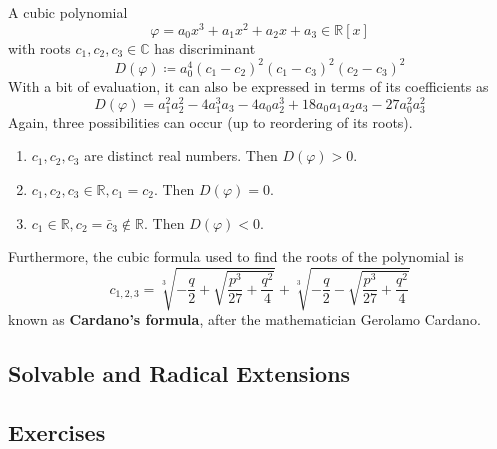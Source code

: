   \begin{lemma}
    \label{thm:cardanos-formula}
    A cubic polynomial 
    \begin{equation}
      \varphi = a_0 x^3 + a_1 x^2 + a_2 x + a_3 \in \mathbb{R}[x]
    \end{equation}
    with roots $c_1, c_2, c_3 \in \mathbb{C}$ has discriminant
    \begin{equation}
      D(\varphi) \coloneqq a_0^4 (c_1 - c_2)^2 (c_1 - c_3)^2 (c_2 - c_3)^2
    \end{equation}
    With a bit of evaluation, it can also be expressed in terms of its coefficients as
    \begin{equation}
      D(\varphi) = a_1^2 a_2^2 - 4a_1^3 a_3 - 4a_0 a_2^3 + 18 a_0 a_1 a_2 a_3 - 27 a_0^2 a_3^2
    \end{equation}
    Again, three possibilities can occur (up to reordering of its roots). 
    \begin{enumerate}
        \item $c_1, c_2, c_3$ are distinct real numbers. Then $D(\varphi) > 0$. 
        \item $c_1, c_2, c_3 \in \mathbb{R}, c_1 = c_2$. Then $D(\varphi) = 0$. 
        \item $c_1 \in \mathbb{R}, c_2 = \bar{c}_3 \not\in \mathbb{R}$. Then $D(\varphi) < 0$. 
    \end{enumerate}
    Furthermore, the cubic formula used to find the roots of the polynomial is 
    \begin{equation}
      c_{1, 2, 3} = \sqrt[3]{-\frac{q}{2} + \sqrt{\frac{p^3}{27} + \frac{q^2}{4}}} + \sqrt[3]{-\frac{q}{2} - \sqrt{\frac{p^3}{27} + \frac{q^2}{4}}}
    \end{equation}
    known as \textbf{Cardano's formula}, after the mathematician Gerolamo Cardano. 
  \end{lemma}

\subsection{Solvable and Radical Extensions}

\subsection{Exercises}

